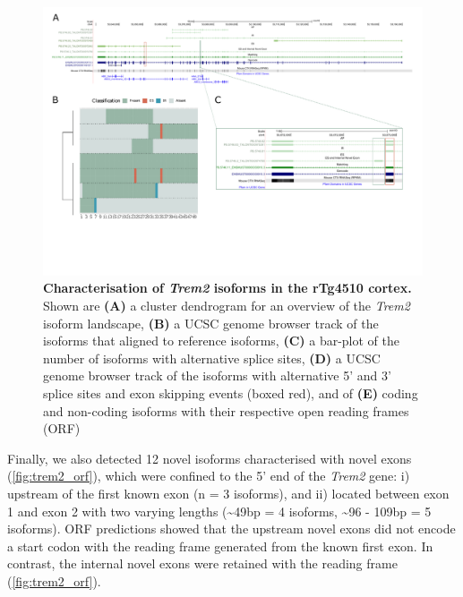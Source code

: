 \begin{landscape}
	\begin{figure}[htp]
		\centering
		\captionsetup{width=1.3\textwidth}
		\includegraphics[page=12,trim={0 2cm 0 0},scale = 0.8]{Figures/TargetGenes_Annotation_Landscape.pdf}
		\caption[Characterisation of the \textit{Trem2} isoform landscape]%
		{\textbf{Characterisation of \textit{Trem2} isoforms in the rTg4510 cortex.} Shown are \textbf{(A)} a cluster dendrogram for an overview of the \textit{Trem2} isoform landscape, \textbf{(B)} a UCSC genome browser track of the isoforms that aligned to reference isoforms, \textbf{(C)} a bar-plot of the number of isoforms with alternative splice sites, \textbf{(D)} a UCSC genome browser track of the isoforms with alternative 5' and 3' splice sites and exon skipping events (boxed red), and of \textbf{(E)} coding and non-coding isoforms with their respective open reading frames (ORF) }    
		\label{fig:trem2}
	\end{figure}
\end{landscape}
\restoregeometry 

Finally, we also detected 12 novel isoforms characterised with novel exons (\cref{fig:trem2_orf}), which were confined to the 5' end of the \textit{Trem2} gene: i)  upstream of the first known exon (n = 3 isoforms), and ii) located between exon 1 and exon 2 with two varying lengths (\textasciitilde49bp = 4 isoforms, \textasciitilde96 - 109bp = 5 isoforms). ORF predictions showed that the upstream novel exons did not encode a start codon with the reading frame generated from the known first exon. In contrast, the internal novel exons were retained with the reading frame (\cref{fig:trem2_orf}). 

